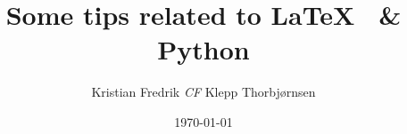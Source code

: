 \author{Kristian Fredrik \emph{CF} Klepp Thorbjørnsen}
\title{Some tips related to \LaTeX~ \& Python}
\date{\today}